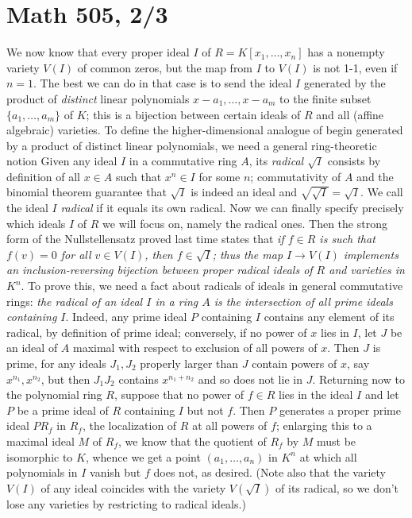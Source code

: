 \documentclass[10pt]{article}
\begin{document}
\section*{Math 505, 2/3}

We now know that every proper ideal $I$ of $R=K[x_1,\ldots,x_n]$ has a
nonempty variety $V(I)$ of common zeros, but the map from $I$ to $V(I)$
is not 1-1, even if $n=1$. The best we can do in that case is to send
the ideal $I$ generated by the product of {\sl distinct} linear
polynomials $x-a_1,\ldots,x-a_m$ to the finite subset
$\{a_1,\ldots,a_m\}$ of $K$; this is a bijection between certain ideals
of $R$ and all (affine algebraic) varieties. To define the
higher-dimensional analogue of begin generated by a product of distinct
linear polynomials, we need a general ring-theoretic notion Given any
ideal $I$ in a commutative ring $A$, its {\sl radical $\sqrt{I}$}
consists by definition of all $x\in A$ such that $x^n\in I$ for some
$n$; commutativity of $A$ and the binomial theorem guarantee that
$\sqrt{I}$ is indeed an ideal and $\sqrt{\sqrt{I}} = \sqrt{I}$. We call
the ideal $I$ {\sl radical} if it equals its own radical. Now we can
finally specify precisely which ideals $I$ of $R$ we will focus on,
namely the radical ones. Then the strong form of the Nullstellensatz
proved last time states that {\sl if $f\in R$ is such that $f(v) = 0$
  for all $v\in V(I)$, then $f\in\sqrt{I}$; thus the map $I\rightarrow
  V(I)$ implements an inclusion-reversing bijection between proper
  radical ideals of $R$ and varieties in $K^n$}. To prove this, we need
a fact about radicals of ideals in general commutative rings: {\sl the
  radical of an ideal $I$ in a ring $A$ is the intersection of all prime
  ideals containing $I$}. Indeed, any prime ideal $P$ containing $I$
contains any element of its radical, by definition of prime ideal;
conversely, if no power of $x$ lies in $I$, let $J$ be an ideal of $A$
maximal with respect to exclusion of all powers of $x$. Then $J$ is
prime, for any ideals $J_1,J_2$ properly larger than $J$ contain powers
of $x$, say $x^{n_1},x^{n_2}$, but then $J_1 J_2$ contains $x^{n_1+n_2}$
and so does not lie in $J$. Returning now to the polynomial ring $R$,
suppose that no power of $f\in R$ lies in the ideal $I$ and let $P$ be a
prime ideal of $R$ containing $I$ but not $f$. Then $P$ generates a
proper prime ideal $PR_f$ in $R_f$, the localization of $R$ at all
powers of $f$; enlarging this to a maximal ideal $M$ of $R_f$, we know
that the quotient of $R_f$ by $M$ must be isomorphic to $K$, whence we
get a point $(a_1,\ldots,a_n)$ in $K^n$ at which all polynomials in $I$
vanish but $f$ does not, as desired. (Note also that the variety $V(I)$
of any ideal coincides with the variety $V(\sqrt{I})$ of its radical, so
we don't lose any varieties by restricting to radical ideals.)
\end{document}
